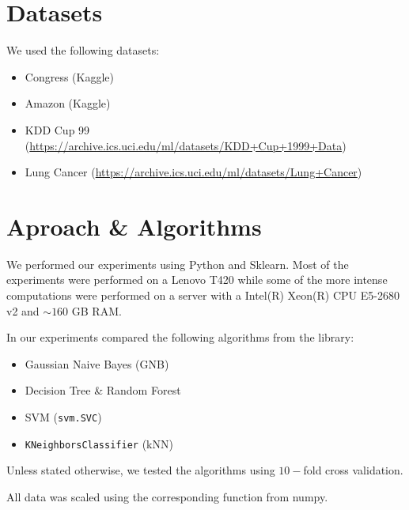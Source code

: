 \section{Datasets}
We used the following datasets:
\begin{itemize}
\item Congress (Kaggle)
\item Amazon (Kaggle)
\item KDD Cup 99 (\url{https://archive.ics.uci.edu/ml/datasets/KDD+Cup+1999+Data})
\item Lung Cancer (\url{https://archive.ics.uci.edu/ml/datasets/Lung+Cancer})
\end{itemize}

\section{Aproach \& Algorithms}
We performed our experiments using Python and Sklearn. Most of the experiments were performed on a Lenovo T420 while some of the more intense computations were performed on a server with a Intel(R) Xeon(R) CPU E5-2680 v2 and $\sim 160$ GB RAM. 

In our experiments compared the following algorithms from the library:
\begin{itemize}
\item Gaussian Naive Bayes (GNB)
\item Decision Tree \& Random Forest
\item SVM (\verb|svm.SVC|)
\item \verb|KNeighborsClassifier| (kNN)
\end{itemize}

Unless stated otherwise, we tested the algorithms using $10-$fold cross validation. 

All data was scaled using the corresponding function from numpy. 
